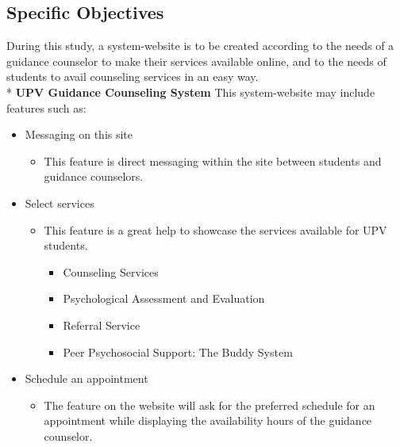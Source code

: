 \subsection{Specific Objectives}
\label{sec:specificobjectives}

%
%
During this study, a system-website is to be created according to the needs of a guidance counselor to make their services available online, and to the needs of students to avail counseling services in an easy way. 
\\*
\newline \textbf{UPV Guidance Counseling System}
\newline
\newline This system-website may include features such as: 
\begin{itemize}
\item Messaging on this site
	\begin{itemize}
	\item This feature is direct messaging within the site between students and guidance counselors. 
	\end{itemize}
\item Select services
	\begin{itemize}
	\item This feature is a great help to showcase the services available for UPV students. 
		\begin{itemize}
		\item Counseling Services 
		\item  Psychological Assessment and Evaluation 
		\item Referral Service 
		\item Peer Psychosocial Support: The Buddy System  
		\end{itemize}
	\end{itemize}
\item Schedule an appointment 
	\begin{itemize}
	\item The feature on the website will ask for the preferred schedule for an appointment while displaying the availability hours of the guidance counselor.
	\end{itemize}
\end{itemize}



\begin{comment}
This subsection is an elaboration of the general objective.  
It states the specific steps that must be undertaken to accomplish the general objective.  
These objectives must be \textbf{S}pecific, \textbf{M}easurable, \textbf{A}ttainable, \textbf{R}ealistic, \textbf{T}ime-bounded.  
A specific objective start with ``to $<$verb$>$'' for example: to design/survey/review/analyze.

Studying a particular programming language or development tool (e.g., to study Windows/Object-Oriented/Graphics/C++ programming) to  accomplish the general objective is inherent in all thesis and, therefore, must not be included here.
\end{comment}


